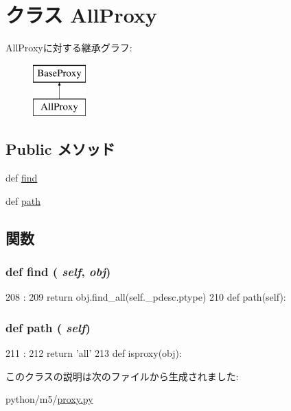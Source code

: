 \hypertarget{classm5_1_1proxy_1_1AllProxy}{
\section{クラス AllProxy}
\label{classm5_1_1proxy_1_1AllProxy}
}
AllProxyに対する継承グラフ:\begin{figure}[H]
\begin{center}
\leavevmode
\includegraphics[height=2cm]{classm5_1_1proxy_1_1AllProxy}
\end{center}
\end{figure}
\subsection*{Public メソッド}
\begin{DoxyCompactItemize}
\item 
def \hyperlink{classm5_1_1proxy_1_1AllProxy_a01f90f57b7acd55e177611f5d0f7df23}{find}
\item 
def \hyperlink{classm5_1_1proxy_1_1AllProxy_a4767b0796ffc0da267b28b3f24776d97}{path}
\end{DoxyCompactItemize}


\subsection{関数}
\hypertarget{classm5_1_1proxy_1_1AllProxy_a01f90f57b7acd55e177611f5d0f7df23}{
\subsubsection[{find}]{\setlength{\rightskip}{0pt plus 5cm}def find ( {\em self}, \/   {\em obj})}}
\label{classm5_1_1proxy_1_1AllProxy_a01f90f57b7acd55e177611f5d0f7df23}



\begin{DoxyCode}
208                        :
209         return obj.find_all(self._pdesc.ptype)
210 
    def path(self):
\end{DoxyCode}
\hypertarget{classm5_1_1proxy_1_1AllProxy_a4767b0796ffc0da267b28b3f24776d97}{
\subsubsection[{path}]{\setlength{\rightskip}{0pt plus 5cm}def path ( {\em self})}}
\label{classm5_1_1proxy_1_1AllProxy_a4767b0796ffc0da267b28b3f24776d97}



\begin{DoxyCode}
211                   :
212         return 'all'
213 
def isproxy(obj):
\end{DoxyCode}


このクラスの説明は次のファイルから生成されました:\begin{DoxyCompactItemize}
\item 
python/m5/\hyperlink{proxy_8py}{proxy.py}\end{DoxyCompactItemize}
